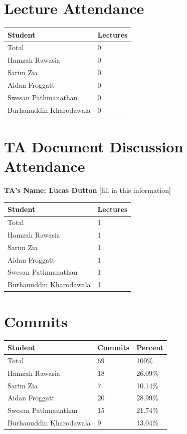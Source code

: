 \documentclass{article}
\begin{document}
\section{Lecture Attendance}

\begin{table}[H]
\centering
\begin{tabular}{ll}
\toprule
\textbf{Student} & \textbf{Lectures}\\
\midrule
Total & 0\\
Hamzah Rawasia & 0\\
Sarim Zia & 0\\
Aidan Froggatt & 0\\
Swesan Pathmanathan & 0\\
Burhanuddin Kharodawala & 0\\
\bottomrule
\end{tabular}
\end{table}

\section{TA Document Discussion Attendance}

\noindent \textbf{TA's Name: Lucas Dutton} [fill in this information]

\begin{table}[H]
\centering
\begin{tabular}{ll}
\toprule
\textbf{Student} & \textbf{Lectures}\\
\midrule
Total & 1\\
Hamzah Rawasia & 1\\
Sarim Zia & 1\\
Aidan Froggatt & 1\\
Swesan Pathmanathan & 1\\
Burhanuddin Kharodawala & 1\\
\bottomrule
\end{tabular}
\end{table}

\section{Commits}

\begin{table}[H]
\centering
\begin{tabular}{lll}
\toprule
\textbf{Student} & \textbf{Commits} & \textbf{Percent}\\
\midrule
Total & 69 & 100\% \\
Hamzah Rawasia & 18 & 26.09\% \\
Sarim Zia & 7 & 10.14\% \\
Aidan Froggatt & 20 & 28.99\% \\
Swesan Pathmanathan & 15 & 21.74\% \\
Burhanuddin Kharodawala & 9 & 13.04\% \\
\bottomrule
\end{tabular}
\end{table}
\end{document}
